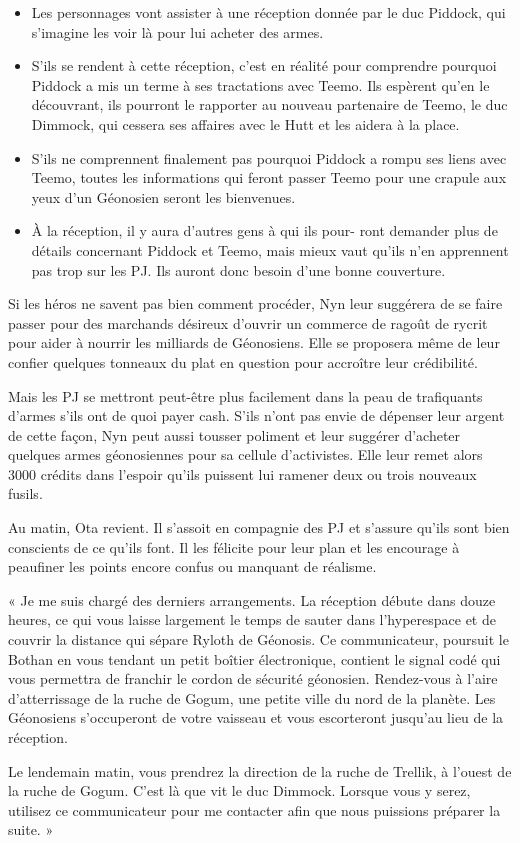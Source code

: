 \documentclass[a4paper,10pt,twoside,twocolumn,openany]{book}
\begin{document}
\begin{itemize}
\item Les personnages vont assister à une réception donnée par le duc Piddock, qui s’imagine les voir là pour lui acheter des armes.
\item S’ils se rendent à cette réception, c’est en réalité pour comprendre pourquoi Piddock a mis un terme à ses tractations avec Teemo. Ils espèrent qu’en le découvrant, ils pourront le rapporter au nouveau partenaire de Teemo, le duc Dimmock, qui cessera ses affaires avec le Hutt et les aidera à la place.

\item S’ils ne comprennent finalement pas pourquoi
Piddock a rompu ses liens avec Teemo, toutes les
informations qui feront passer Teemo pour une crapule aux yeux d’un Géonosien seront les bienvenues.

\item À la réception, il y aura d’autres gens à qui ils pour-
ront demander plus de détails concernant Piddock
et Teemo, mais mieux vaut qu’ils n’en apprennent
pas trop sur les PJ. Ils auront donc besoin d’une
bonne couverture.
\end{itemize}

Si les héros ne savent pas bien comment procéder,
Nyn leur suggérera de se faire passer pour des marchands désireux d’ouvrir un commerce de ragoût de rycrit pour aider à nourrir les milliards de Géonosiens. Elle
se proposera même de leur confier quelques tonneaux
du plat en question pour accroître leur crédibilité.

Mais les PJ se mettront peut-être plus facilement dans
la peau de trafiquants d’armes s’ils ont de quoi payer
cash. S’ils n’ont pas envie de dépenser leur argent de
cette façon, Nyn peut aussi tousser poliment et leur
suggérer d’acheter quelques armes géonosiennes pour
sa cellule d’activistes. Elle leur remet alors 3000 crédits
dans l’espoir qu’ils puissent lui ramener deux ou trois
nouveaux fusils.

Au matin, Ota revient. Il s’assoit en compagnie des PJ
et s’assure qu’ils sont bien conscients de ce qu’ils font. Il
les félicite pour leur plan et les encourage à peaufiner les
points encore confus ou manquant de réalisme.

\begin{quotebox}
« Je me suis chargé des derniers arrangements. La
réception débute dans douze heures, ce qui vous
laisse largement le temps de sauter dans l’hyperespace et de couvrir la distance qui sépare Ryloth
de Géonosis. Ce communicateur, poursuit le Bothan en vous tendant un petit boîtier électronique,
contient le signal codé qui vous permettra de franchir le cordon de sécurité géonosien. Rendez-vous
à l’aire d’atterrissage de la ruche de Gogum, une
petite ville du nord de la planète. Les Géonosiens
s’occuperont de votre vaisseau et vous escorteront jusqu’au lieu de la réception.

Le lendemain matin, vous prendrez la direction de la ruche de Trellik, à l’ouest de la ruche
de Gogum. C’est là que vit le duc Dimmock.
Lorsque vous y serez, utilisez ce communicateur
pour me contacter afin que nous puissions préparer la suite. »
\end{quotebox}
\end{document}
